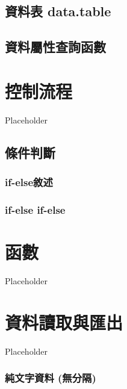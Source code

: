 \documentclass[]{book}
\begin{document}
\hypertarget{ux8cc7ux6599ux8868-data.table}{%
\section{資料表 data.table}\label{ux8cc7ux6599ux8868-data.table}}

\hypertarget{ux8cc7ux6599ux5c6cux6027ux67e5ux8a62ux51fdux6578}{%
\section{資料屬性查詢函數}\label{ux8cc7ux6599ux5c6cux6027ux67e5ux8a62ux51fdux6578}}

\hypertarget{controlstructure}{%
\chapter{控制流程}\label{controlstructure}}

Placeholder

\hypertarget{ux689dux4ef6ux5224ux65b7}{%
\section{條件判斷}\label{ux689dux4ef6ux5224ux65b7}}

\hypertarget{if-elseux6558ux8ff0}{%
\subsection{if-else敘述}\label{if-elseux6558ux8ff0}}

\hypertarget{if-else-if-else}{%
\subsection{if-else if-else}\label{if-else-if-else}}

\hypertarget{function}{%
\chapter{函數}\label{function}}

Placeholder

\hypertarget{io}{%
\chapter{資料讀取與匯出}\label{io}}

Placeholder

\hypertarget{ux7d14ux6587ux5b57ux8cc7ux6599-ux7121ux5206ux9694}{%
\subsection{純文字資料 (無分隔)}\label{ux7d14ux6587ux5b57ux8cc7ux6599-ux7121ux5206ux9694}}
\end{document}
